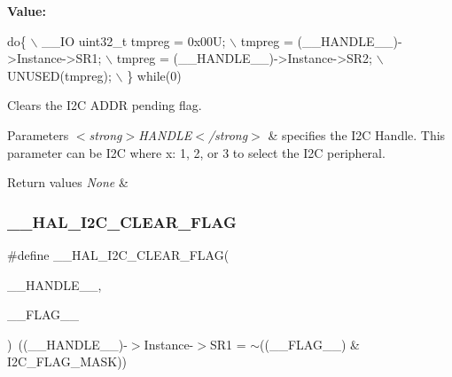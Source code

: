 {\bfseries Value\+:}
\begin{DoxyCode}
\textcolor{keywordflow}{do}\{                                           \(\backslash\)
    \_\_IO uint32\_t tmpreg = 0x00U;               \(\backslash\)
    tmpreg = (\_\_HANDLE\_\_)->Instance->SR1;       \(\backslash\)
    tmpreg = (\_\_HANDLE\_\_)->Instance->SR2;       \(\backslash\)
    UNUSED(tmpreg);                             \(\backslash\)
  \} \textcolor{keywordflow}{while}(0)
\end{DoxyCode}


Clears the I2C A\+D\+DR pending flag. 


\begin{DoxyParams}{Parameters}
{\em $<$strong$>$\+H\+A\+N\+D\+L\+E$<$/strong$>$} & specifies the I2C Handle. This parameter can be I2C where x\+: 1, 2, or 3 to select the I2C peripheral. \\
\hline
\end{DoxyParams}

\begin{DoxyRetVals}{Return values}
{\em None} & \\
\hline
\end{DoxyRetVals}
\mbox{\label{group___i2_c___exported___macros_ga933e2ea67e86db857a06b70a93be1186}} 
\subsubsection{\texorpdfstring{\+\_\+\+\_\+\+H\+A\+L\+\_\+\+I2\+C\+\_\+\+C\+L\+E\+A\+R\+\_\+\+F\+L\+AG}{\_\_HAL\_I2C\_CLEAR\_FLAG}}
{\footnotesize\ttfamily \#define \+\_\+\+\_\+\+H\+A\+L\+\_\+\+I2\+C\+\_\+\+C\+L\+E\+A\+R\+\_\+\+F\+L\+AG(\begin{DoxyParamCaption}\item[{}]{\+\_\+\+\_\+\+H\+A\+N\+D\+L\+E\+\_\+\+\_\+,  }\item[{}]{\+\_\+\+\_\+\+F\+L\+A\+G\+\_\+\+\_\+ }\end{DoxyParamCaption})~((\+\_\+\+\_\+\+H\+A\+N\+D\+L\+E\+\_\+\+\_\+)-\/$>$Instance-\/$>$S\+R1 = $\sim$((\+\_\+\+\_\+\+F\+L\+A\+G\+\_\+\+\_\+) \& I2\+C\+\_\+\+F\+L\+A\+G\+\_\+\+M\+A\+SK))}




